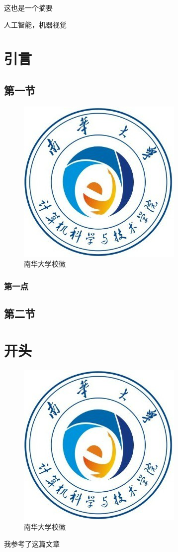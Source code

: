 \documentclass{usc}
\begin{document}
	
	\cover
	\tableofcontents
	\newpage
	\begin{uscabstract}
		这也是一个摘要
	\end{uscabstract}
	\begin{usckeywords}
		人工智能，机器视觉
	\end{usckeywords}
	\section{引言}
	\subsection{第一节}
	\begin{figure}
		\centering
		\includegraphics{./Pictures/usc.png}	
		\caption{南华大学校徽}	
	\end{figure}

	
	\subsubsection{第一点}
	\subsection{第二节}
	\section{开头}
	\setcounter{figure}{0}
	\begin{figure}
		\centering
		\includegraphics{./Pictures/usc.png}	
		\caption{南华大学校徽}	
	\end{figure}



	我参考了这篇文章\cite{girshick2014rich}	
	
		
\end{document}
